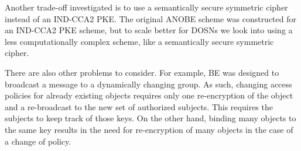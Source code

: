 Another trade-off investigated is to use a semantically secure symmetric cipher 
instead of an IND-CCA2 \acl{PKE}.
The original \acl{ANOBE} scheme was constructed for an IND-CCA2 \acl{PKE} 
scheme, but to scale better for \acp{DOSN} we look into using a less 
computationally complex scheme, like a semantically secure symmetric cipher.

There are also other problems to consider.
For example, \acl{BE} was designed to broadcast a message to a dynamically 
changing group.
As such, changing access policies for already existing objects requires only 
one re-encryption of the object and a re-broadcast to the new set of authorized 
subjects.
This requires the subjects to keep track of those keys.
On the other hand, binding many objects to the same key results in the need for 
re-encryption of many objects in the case of a change of policy.


\printbibliography
